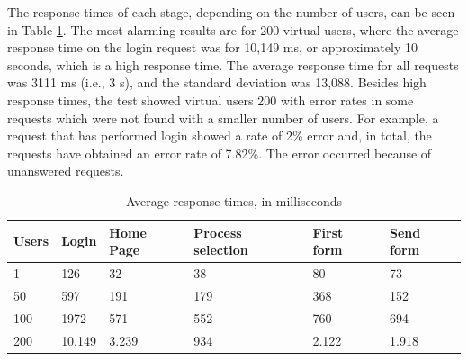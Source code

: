 \documentclass[runningheads,a4paper]{llncs}
\begin{document}

The response times of each stage, depending on the number of users, can be seen in Table \ref{tab:resultadoCarga}. The most alarming results are for 200 virtual users, where the average response time on the login request was for 10,149 ms, or approximately 10 seconds, which is a high response time. The average response time for all requests was 3111 ms (i.e., 3 s), and the standard deviation was 13,088. Besides high response times, the test showed virtual users 200 with error rates in some requests which were not found with a smaller number of users. For example, a request that has performed login showed a rate of 2\% error and, in total, the requests have obtained an error rate of 7.82\%. The error occurred because of unanswered requests.


\begin{table}
\centering
\begin{tabular}{p{2cm}|p{2cm}|p{2cm}|p{2cm}|p{2cm}|p{2cm}}
\hline
Users & Login & Home Page & Process selection & First form & Send form \\\hline
1 & 126 & 32 & 38 & 80 & 73\\\hline
50 & 597 & 191 & 179 & 368 & 152\\\hline
100 & 1972 & 571 & 552 & 760 & 694\\\hline
200 & 10.149 & 3.239 & 934 & 2.122 & 1.918\\\hline
\end{tabular}
\caption{Average response times, in milliseconds}
\label{tab:resultadoCarga}
\end{table}
\end{document}
